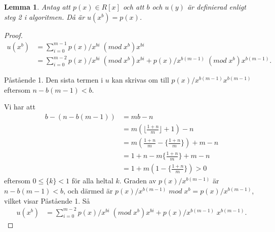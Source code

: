 \documentclass[a4paper]{article}
\newtheorem{lemma}[theorem]{Lemma}
\begin{document}
\begin{lemma}
 Antag att $p(x) \in R[x]$ och att $b$ och $u(y)$ är definierad enligt steg 2 i algoritmen. Då är $u(x^b)=p(x)$.
\end{lemma}
\begin{proof}


\begin{align*}
u(x^b) &= \sum_{i = 0}^{m-1} p(x)/x^{bi} \; (mod \; x^b) x^{bi} \\
&= \sum_{i = 0}^{m-2} p(x)/x^{bi} \; (mod \; x^b) x^{bi} + p(x)/x^{b(m-1)} \; (mod \; x^b) x^{b(m-1)}.
\end{align*}

Påstående 1. Den sista termen i $u$ kan skrivas om till $p(x)/x^{b(m-1)} x^{b(m-1)}$ eftersom $n - b(m-1) < b$.

Vi har att
\begin{align*}
 b - (n - b(m-1)) &= m b - n \\
&= m (\lfloor \frac{1 + n}{m}\rfloor + 1) - n \\
&= m( \frac{1 + n}{m} -\{ \frac{1 + n}{m}\} ) + m - n \\
&= 1 + n - m \{ \frac{1 + n}{m}\} + m - n \\
&= 1 + m(1 - \{ \frac{1 + n}{m}\}) > 0
\end{align*}
eftersom $0 \leq \{ k \} < 1$ för alla heltal $k$. Graden av $p(x)/x^{b(m-1)}$ är $n - b(m-1) < b$,
och därmed är $p(x)/x^{b(m-1)} \; mod \; x^b = p(x)/x^{b(m-1)}$, vilket visar Påstående 1. Så
\begin{align*}
u(x^b) &= \sum_{i = 0}^{m-2} p(x)/x^{bi} \; (mod \; x^b) x^{bi} + p(x)/x^{b(m-1)} \; x^{b(m-1)}.
\end{align*}
\end{proof}


\nocite{*}
\appendix
\end{document}
